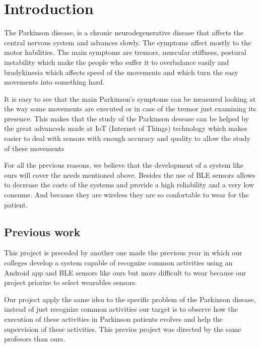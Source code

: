 \documentclass[11pt,spanish]{article}
\begin{document}
\section{Introduction}

The Parkinson disease, is a chronic neurodegenerative disease that affects the central nervous system and advances slowly. The symptoms affect mostly to the motor habilities. The main symptoms are tremors, muscular stiffness, postural instability which make the people who suffer it to overbalance easily and bradykinesia which affects speed of the movements and which turn the easy movements into something hard.
\newline

It is easy to see that the main Parkinson's symptoms can be measured looking at the way some movements are executed or in case of the tremor just examining its presence. This makes that the study of the Parkinson desease can be helped by the great advanceds made at IoT (Internet of Things) technology which makes easier to deal with sensors with enough accuracy and quality to allow the study of these movements
\newline

For all the previous reasons, we believe that the development of a system like ours will cover the needs mentioned above. Besides the use of BLE sensors allows to decrease the costs of the systems and provide a high reliability and a very low consume. And because they are wireless they are so confortable to wear for the patient.
\newline

\subsection{Previous work}

This project is preceded by another one made the previous year \cite{TFG_Anterior} in which our colleges develop a system capable of recognize common activities using an Android app and BLE sensors like ours but more difficult to wear because our project priorize to select wearables sensors.
\newline

Our project apply the same idea to the specific problem of the Parkinson disease, instead of just recognize common activities our target is to observe how the execution of these activities in Parkinson patients evolves and help the supervision of these activities. This previos project was directed by the same profesors than ours.
\newline
\end{document}
